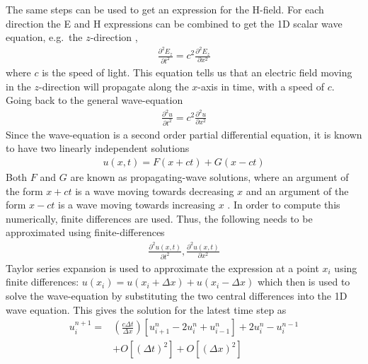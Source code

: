 The same steps can be used to get an expression for the H-field. For each direction the E and H expressions can be combined to get the 1D scalar wave equation, e.g.\ the $z$-direction \cite{taflove2000computional},
\begin{align}
  \frac{\partial^2 E_z}{\partial t^2} = c^2 \frac{\partial^2 E_z}{\partial x^2}
\end{align}
where $c$ is the speed of light. This equation tells us that an electric field moving in the $z$-direction will propagate along the $x$-axis in time, with a speed of $c$. Going back to the general wave-equation \cite{taflove2000computional}
\begin{align}
  \frac{\partial^2 u}{\partial t^2} = c^2 \frac{\partial^2 u}{\partial x^2}
\end{align}
Since the wave-equation is a second order partial differential equation, it is known to have two linearly independent solutions \cite{taflove2000computional}
\begin{align}
  u(x,t) = F(x+ct) + G(x-ct)
\end{align}
Both $F$ and $G$ are known as propagating-wave solutions, where an argument of the form $x+ct$ is a wave moving towards decreasing $x$ and an argument of the form $x-ct$ is a wave moving towards increasing $x$ \cite{taflove2000computional}. In order to compute this numerically, finite differences are used. Thus, the following needs to be approximated using finite-differences 
\begin{align}
  \frac{\partial^2 u(x,t)}{\partial t^2},\frac{\partial^2 u(x,t)}{\partial x^2}
\end{align}
Taylor series expansion is used to approximate the expression at a point $x_i$ using finite differences: $u(x_i) = u(x_i+\Delta x) + u(x_i - \Delta x)$ which then is used to solve the wave-equation by substituting the two central differences into the 1D wave equation. This gives the solution for the latest time step as \cite{taflove2000computional}
\begin{align}
  u_i^{n+1} =& \left( \frac{c\Delta t}{\Delta x} \right) \left[ u_{i+1}^n - 2u_i^n + u_{i-1}^n \right] + 2u_i^n -u_i^{n-1} \\
             &+ O[(\Delta t)^2] + O[(\Delta x)^2]
\end{align}


